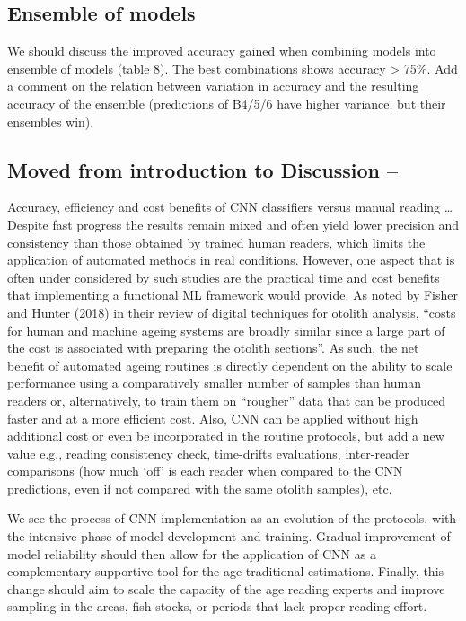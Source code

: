 \documentclass[10pt,letterpaper]{article}
\begin{document}
\subsection*{Ensemble of models}
We should discuss the improved accuracy gained when combining models into ensemble of models (table 8). The best combinations shows accuracy > 75\%.
Add a comment on the relation between variation in accuracy and the resulting accuracy of the ensemble (predictions of B4/5/6 have higher variance, but their ensembles win). 

\subsection*{Moved from introduction to Discussion –  }

Accuracy, efficiency and cost benefits of CNN classifiers versus manual reading 
…Despite fast progress the results remain mixed and often yield lower precision and consistency than those obtained by trained human readers, which limits the application of automated methods in real conditions.
However, one aspect that is often under considered by such studies are the practical time and cost benefits that implementing a functional ML framework would provide. As noted by Fisher and Hunter (2018) \citep{Fisher} in their review of digital techniques for otolith analysis, “costs for human and machine ageing systems are broadly similar since a large part of the cost is associated with preparing the otolith sections”. As such, the net benefit of automated ageing routines is directly dependent on the ability to scale performance using a comparatively smaller number of samples than human readers or, alternatively, to train them on “rougher” data that can be produced faster and at a more efficient cost.
Also, CNN can be applied without high additional cost or even be incorporated in the routine protocols, but add a new value e.g., reading consistency check, time-drifts evaluations, inter-reader comparisons (how much ‘off’ is each reader when compared to the CNN predictions, even if not compared with the same otolith samples), etc.

We see the process of CNN implementation as an evolution of the protocols, with the intensive phase of model development and training. Gradual improvement of model reliability should then allow for the application of CNN as a complementary supportive tool for the age traditional estimations. Finally, this change should aim to scale the capacity of the age reading experts and improve sampling in the areas, fish stocks, or periods that lack proper reading effort.
\end{document}
